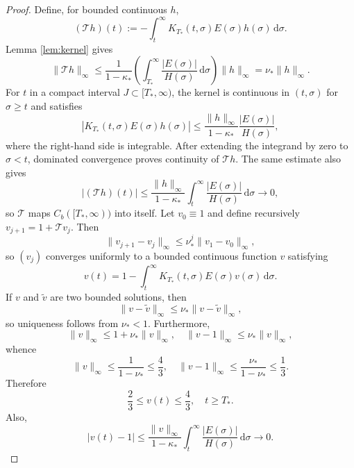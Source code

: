 \documentclass[11pt,reqno]{amsart}
\theoremstyle{definition}
\theoremstyle{remark}
\begin{document}
\begin{proof}
		Define, for bounded continuous $h$,
		$$
		(\mathcal Th)(t):=-\int_t^\infty K_{T_*}(t,\sigma)E(\sigma)h(\sigma)\,\mathrm{d}\sigma.
		$$
		Lemma \ref{lem:kernel} gives
		$$
		\|\mathcal Th\|_\infty
		\leq\frac{1}{1-\kappa_*}
		\left(\int_{T_*}^\infty\frac{|E(\sigma)|}{H(\sigma)}\,\mathrm{d}\sigma\right)
		\|h\|_\infty
		=\nu_*\|h\|_\infty.
		$$
		For $t$ in a compact interval $J\subset[T_*,\infty)$, the kernel is continuous in $(t,\sigma)$ for $\sigma\geq t$ and satisfies
		$$
		|K_{T_*}(t,\sigma)E(\sigma)h(\sigma)|
		\leq
		\frac{\|h\|_\infty}{1-\kappa_*}
		\frac{|E(\sigma)|}{H(\sigma)},
		$$
		where the right-hand side is integrable. After extending the integrand by zero to $\sigma<t$, dominated convergence proves continuity of $\mathcal Th$. The same estimate also gives
		$$
		|(\mathcal Th)(t)|
		\leq
		\frac{\|h\|_\infty}{1-\kappa_*}
		\int_t^\infty\frac{|E(\sigma)|}{H(\sigma)}\,\mathrm d\sigma
		\longrightarrow0,
		$$
		so $\mathcal T$ maps $C_b([T_*,\infty))$ into itself. Let $v_0\equiv1$ and define recursively $v_{j+1}=1+\mathcal Tv_j$. Then
		$$
		\|v_{j+1}-v_j\|_\infty
		\leq\nu_*^j\|v_1-v_0\|_\infty,
		$$
		so $(v_j)$ converges uniformly to a bounded continuous function $v$ satisfying
		$$
		v(t)=1-\int_t^\infty K_{T_*}(t,\sigma)E(\sigma)v(\sigma)\,\mathrm{d}\sigma.
		$$
		If $v$ and $\widetilde v$ are two bounded solutions, then
		$$
		\|v-\widetilde v\|_\infty
		\leq\nu_*\|v-\widetilde v\|_\infty,
		$$
		so uniqueness follows from $\nu_*<1$. Furthermore,
		$$
		\|v\|_\infty\leq1+\nu_*\|v\|_\infty,
		\quad
		\|v-1\|_\infty\leq\nu_*\|v\|_\infty,
		$$
		whence
		$$
		\|v\|_\infty\leq\frac{1}{1-\nu_*}\leq\frac43,
		\quad
		\|v-1\|_\infty\leq\frac{\nu_*}{1-\nu_*}\leq\frac13.
		$$
		Therefore
		\begin{equation}
			\label{eq:v-tail-bounds}
			\frac23\leq v(t)\leq\frac43,
			\quad t\geq T_*.
		\end{equation}
		Also,
		$$
		|v(t)-1|
		\leq\frac{\|v\|_\infty}{1-\kappa_*}
		\int_t^\infty\frac{|E(\sigma)|}{H(\sigma)}\,\mathrm{d}\sigma
		\longrightarrow0.
		$$
		

\end{proof}
\end{document}
